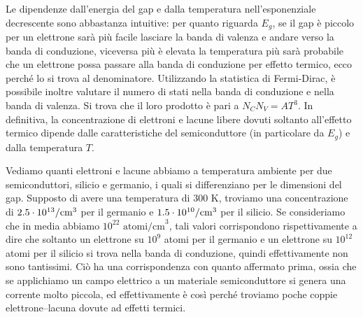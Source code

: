 Le dipendenze dall'energia del gap e dalla temperatura nell'esponenziale decrescente sono abbastanza intuitive: per quanto riguarda $E_g$, se il gap è piccolo per un elettrone sarà più facile lasciare la banda di valenza e andare verso la banda di conduzione, viceversa più è elevata la temperatura più sarà probabile che un elettrone possa passare alla banda di conduzione per effetto termico, ecco perché lo si trova al denominatore. Utilizzando la statistica di Fermi-Dirac, è possibile inoltre valutare il numero di stati nella banda di conduzione e nella banda di valenza. Si trova che il loro prodotto è pari a $N_C N_V=AT^3$. In definitiva, la concentrazione di elettroni e lacune libere dovuti soltanto all'effetto termico dipende dalle caratteristiche del semiconduttore (in particolare da $E_g$) e dalla temperatura $T$.

Vediamo quanti elettroni e lacune abbiamo a temperatura ambiente per due semiconduttori, silicio e germanio, i quali si differenziano per le dimensioni del gap. Supposto di avere una temperatura di 300 K, troviamo una concentrazione di $2.5 \cdot 10^{13}/\rm cm^3$ per il germanio e $1.5 \cdot 10^{10}/\rm cm^3$ per il silicio. Se consideriamo che in media abbiamo $10^{22} \text{ atomi/cm}^3$, tali valori corrispondono rispettivamente a dire che soltanto un elettrone su $10^9$ atomi per il germanio e un elettrone su $10^{12}$ atomi per il silicio si trova nella banda di conduzione, quindi effettivamente non sono tantissimi. Ciò ha una corrispondenza con quanto affermato prima, ossia che se applichiamo un campo elettrico a un materiale semiconduttore si genera una corrente molto piccola, ed effettivamente è così perché troviamo poche coppie elettrone--lacuna dovute ad effetti termici.
